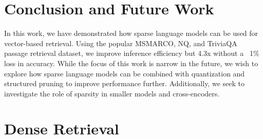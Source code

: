 \documentclass[11pt]{article}
\begin{document}
\section{Conclusion and Future Work}
In this work, we have demonstrated how sparse language models can be used for vector-based retrieval. Using the popular MSMARCO, NQ, and TriviaQA passage retrieval dataset, we improve inference efficiency but 4.3x without a ~1\% loss in accuracy. While the focus of this work is narrow in the future, we wish to explore how sparse language models can be combined with quantization and structured pruning to improve performance further. Additionally, we seek to investigate the role of sparsity in smaller models and cross-encoders.  


\appendix
\section{Dense Retrieval}
\begin{table*}[!htb]
    \centering
    \small
    \caption{Performance of sparse-transferred oBERT compared to BERT-base on the NQ passage retrieval dataset}
    \label{tab:NQ-Sparse-Tranfer}
\end{table*}
\end{document}

